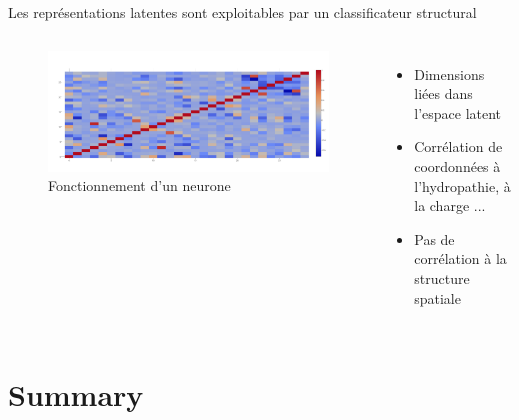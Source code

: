 \documentclass{beamer}
\begin{document}
\begin{frame}{Les représentations latentes sont exploitables par un
    classificateur structural}

  \begin{columns}
    \begin{figure}
      \centering
      \includegraphics[scale=0.1750]{../Figures/SingleOneRecHeat}
      \caption{Fonctionnement d'un neurone}
    \end{figure}

    \begin{itemize}
    \item Dimensions liées dans l'espace latent\pause
    \item Corrélation de coordonnées à l'hydropathie, à la charge ...\pause
    \item Pas de corrélation à la structure spatiale\pause
    \end{itemize}
  \end{columns}

 \end{frame}



\section*{Summary}
\end{document}
